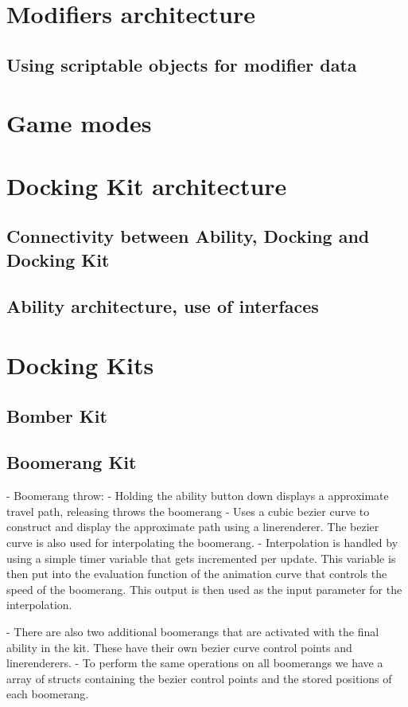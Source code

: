 \section{Modifiers architecture}
\subsection{Using scriptable objects for modifier data}

\section{Game modes}

\section{Docking Kit architecture}
\subsection{Connectivity between Ability, Docking and Docking Kit}
\subsection{Ability architecture, use of interfaces}

\section{Docking Kits}
\subsection{Bomber Kit}
\subsection{Boomerang Kit}
- Boomerang throw:
    - Holding the ability button down displays a approximate travel path, releasing throws the boomerang
    - Uses a cubic bezier curve to construct and display the approximate path using a linerenderer. The bezier curve is also used for interpolating the boomerang.
    - Interpolation is handled by using a simple timer variable that gets incremented per update. This variable is then put into the evaluation function of the animation curve that controls the speed of the boomerang. This output is then used as the input parameter for the interpolation. 
    
    - There are also two additional boomerangs that are activated with the final ability in the kit. These have their own bezier curve control points and linerenderers.
    - To perform the same operations on all boomerangs we have a array of structs containing the bezier control points and the stored positions of each boomerang. 
    
